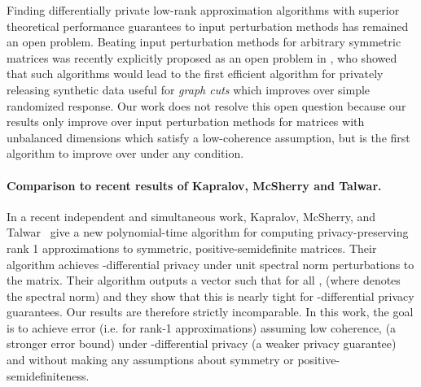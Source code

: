 \documentclass[letterpaper,11pt]{article}
\theoremstyle{definition}
\begin{document}
Finding differentially private low-rank approximation algorithms with superior
theoretical performance guarantees to input perturbation methods has remained
an open problem. Beating input perturbation methods for arbitrary symmetric
matrices was recently explicitly proposed as an open problem in
\cite{GuptaRU11}, who showed that such algorithms would lead to the first
efficient algorithm for privately releasing synthetic data useful for
\emph{graph cuts} which improves over simple randomized response. Our work
does not resolve this open question because our results only improve over
input perturbation methods for matrices with unbalanced dimensions which
satisfy a low-coherence assumption, but is the first algorithm to improve over
\cite{BlumDMN05} under any condition.

\paragraph{Comparison to recent results of Kapralov, McSherry and Talwar.}

In a recent independent and simultaneous work, Kapralov, McSherry, and
Talwar~\cite{KapralovMT11} give a new polynomial-time algorithm for computing
privacy-preserving rank 1 approximations to symmetric, positive-semidefinite matrices. Their algorithm achieves
-differential privacy under unit spectral norm perturbations to
the matrix. Their algorithm outputs a vector  such that for all ,  (where  denotes the spectral norm) and they show that this is nearly tight for -differential privacy guarantees. Our results are therefore
strictly incomparable. In this work, the goal is to achieve error
 (i.e.  for rank-1 approximations) assuming low coherence, (a stronger error bound) under
-differential privacy (a weaker privacy guarantee) and without making any assumptions about symmetry or positive-semidefiniteness.
\end{document}

